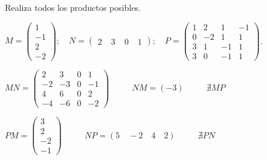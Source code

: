 \begin{ejre} Realiza todos los productos posibles.
		
\noindent \small{$M=\left( \begin{matrix} 1\\-1\\2\\-2   \end{matrix} \right); \quad N=\left( \begin{matrix}  2&\;3&\;0&\;1  \end{matrix} \right); \quad P=\left( \begin{matrix} 1&2&1&-1 \\0&-2&1&1\\3&1&-1&1\\3&0&-1&1   \end{matrix} \right)$}\normalsize{.}

\end{ejre}

\begin{proofw}\renewcommand{\qedsymbol}{$\diamond$}


$MN=\left( \begin{matrix}  2&3&0&1\\-2&-3&0&-1\\4&6&0&2\\-4&-6&0&-2  \end{matrix} \right)$ $\qquad$ 
$NM=(-3)$ $\qquad$ 
$\nexists MP$ 

$PM=\left( \begin{matrix}  3\\2\\-2\\-1  \end{matrix} \right)$
$\qquad$ 
$NP=(5\quad -2\quad 4\quad 2)$ $\qquad$
$\nexists PN$


\end{proofw}


